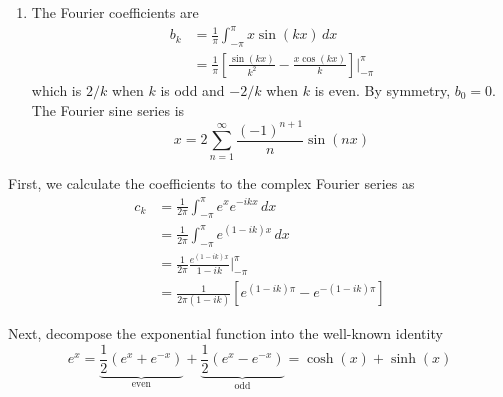 \documentclass[a4paper]{article}
\begin{document}
\begin{enumerate}[label=(\alph*)]
\begin{align*}
		 & = \frac{4}{\pi \!\left( 1 - k^{2} \right)}
	\end{align*}
	To cleanly put this in a summation, let \( k = 2n \). Then 
	\[
		\abs{\sin\!\left(x\right) } = \frac{2}{\pi} + \frac{4}{\pi} \sum_{n = 1}^{\infty} \frac{\cos\!\left(2nx\right) }{1 - 4n^{2}}, \quad -\pi \le x \le \pi
	\]
	\item The Fourier coefficients are
	\begin{align*}
		b_{k} & = \frac{1}{\pi} \int^{\pi}_{-\pi} x \sin\!\left(kx\right) \, dx \\
		 & = \frac{1}{\pi} \!\left[ \frac{\sin\!\left(kx\right) }{k^{2}} - \frac{x \cos\!\left(kx\right) }{k} \right] \Big|^{\pi}_{-\pi} 
	\end{align*}
	which is \( 2 / k \) when \( k \) is odd and \( -2 / k \) when \( k \) is even. By symmetry, \( b_{0} = 0 \). The Fourier sine series is
	\[
		x = 2 \sum_{n = 1}^{\infty} \frac{\!\left( -1 \right)^{n + 1}}{n} \sin\!\left(nx\right)  
	\]
\end{enumerate}


First, we calculate the coefficients to the complex Fourier series as 
\begin{align*}
	c_{k} & = \frac{1}{2 \pi} \int^{\pi}_{-\pi} e^{x} e^{-ikx} \, dx \\
	 & = \frac{1}{2 \pi} \int^{\pi}_{-\pi} e^{\!\left( 1 - ik \right)x} \, dx  \\ 
	 & = \frac{1}{2 \pi} \frac{e^{\!\left( 1 - ik \right)x}}{1 - ik} \Big|^{\pi}_{-\pi} \\
	 & = \frac{1}{2 \pi \!\left( 1 - ik \right)} \!\left[ e^{\!\left( 1 - ik \right)\pi} - e^{-\!\left( 1 - ik \right)\pi} \right]
\end{align*}

Next, decompose the exponential function into the well-known identity
\[
	e^{x} = \underbrace{\frac{1}{2} \!\left( e^{x} + e^{-x} \right)}_{\text{even}} + \underbrace{\frac{1}{2} \!\left( e^{x} - e^{-x} \right)}_{\text{odd}} = \cosh\!\left( x \right) + \sinh\!\left( x \right)
\]
\end{document}
